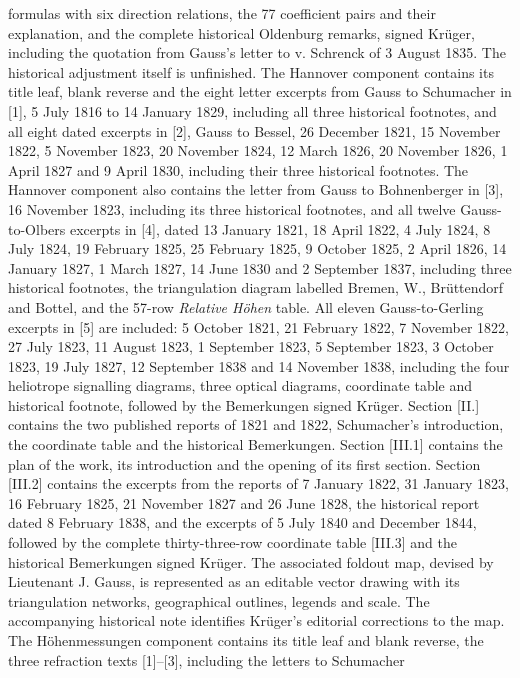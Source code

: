 formulas with six direction relations, the 77 coefficient pairs and
their explanation, and the complete historical Oldenburg remarks,
signed Krüger, including the quotation from Gauss's letter to v. Schrenck
of 3 August 1835. The historical adjustment itself is unfinished.
The Hannover component contains its title leaf, blank reverse and the eight letter
excerpts from Gauss to Schumacher in [1], 5 July 1816 to 14 January 1829,
including all three historical footnotes, and all eight dated excerpts
in [2], Gauss to Bessel, 26 December 1821, 15 November 1822,
5 November 1823, 20 November 1824, 12 March 1826, 20 November 1826, 1 April 1827 and 9 April 1830, including their three historical footnotes.
The Hannover component also contains the letter from Gauss to Bohnenberger in [3],
16 November 1823, including its three historical footnotes, and all twelve
Gauss-to-Olbers excerpts in [4], dated 13 January 1821, 18 April 1822, 4 July 1824, 8 July 1824, 19 February 1825, 25 February 1825, 9 October 1825, 2 April 1826, 14 January 1827, 1 March 1827, 14 June 1830 and 2 September 1837,
including three historical footnotes, the triangulation diagram labelled Bremen, W., Brüttendorf and Bottel,
and the 57-row \textit{Relative Höhen} table.
All eleven Gauss-to-Gerling excerpts in [5] are included: 5 October 1821,
21 February 1822, 7 November 1822, 27 July 1823, 11 August 1823, 1 September 1823, 5 September 1823, 3 October 1823, 19 July 1827, 12 September 1838 and 14 November 1838,
including the four heliotrope signalling diagrams, three optical diagrams,
coordinate table and historical footnote, followed by the Bemerkungen signed Krüger.
Section [II.] contains the two published reports of 1821 and 1822,
Schumacher's introduction, the coordinate table and the historical Bemerkungen.
Section [III.1] contains the plan of the work, its introduction and the
opening of its first section. Section [III.2] contains the excerpts from
the reports of 7 January 1822, 31 January 1823, 16 February 1825,
21 November 1827 and 26 June 1828, the historical report dated
8 February 1838, and the excerpts of 5 July 1840 and December 1844,
followed by the complete thirty-three-row coordinate table [III.3]
and the historical Bemerkungen signed Krüger. The associated foldout
map, devised by Lieutenant J. Gauss, is represented as an editable
vector drawing with its triangulation networks, geographical outlines,
legends and scale. The accompanying historical note identifies
Krüger's editorial corrections to the map.
The Höhenmessungen component contains its title leaf and blank reverse,
the three refraction texts [1]--[3], including the letters to Schumacher
